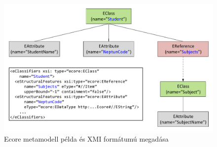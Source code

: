 %
\begin{figure}[!b]
\centering
\includegraphics[width=\textwidth]{figures/datamodel-example-with-xmi-desc.pdf}
\caption{Ecore metamodell példa és XMI formátumú megadása}
\label{fig:DataModelWithXMI}
\end{figure}

